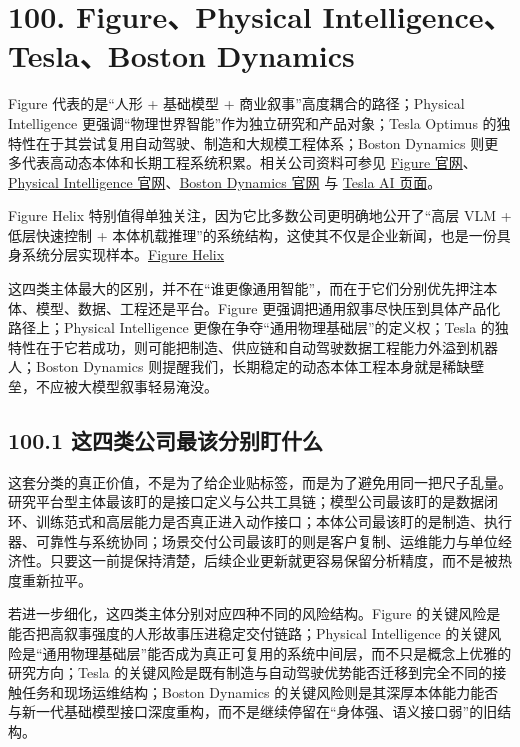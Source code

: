 \section*{100. Figure、Physical Intelligence、Tesla、Boston Dynamics}

Figure 代表的是“人形 + 基础模型 + 商业叙事”高度耦合的路径；Physical Intelligence 更强调“物理世界智能”作为独立研究和产品对象；Tesla Optimus 的独特性在于其尝试复用自动驾驶、制造和大规模工程体系；Boston Dynamics 则更多代表高动态本体和长期工程系统积累。相关公司资料可参见 \href{https://www.figure.ai/}{Figure 官网}、\href{https://www.physicalintelligence.company/}{Physical Intelligence 官网}、\href{https://bostondynamics.com/}{Boston Dynamics 官网} 与 \href{https://www.tesla.com/AI}{Tesla AI 页面}。

Figure Helix 特别值得单独关注，因为它比多数公司更明确地公开了“高层 VLM + 低层快速控制 + 本体机载推理”的系统结构，这使其不仅是企业新闻，也是一份具身系统分层实现样本。\href{https://www.figure.ai/news/helix}{Figure Helix}

这四类主体最大的区别，并不在“谁更像通用智能”，而在于它们分别优先押注本体、模型、数据、工程还是平台。Figure 更强调把通用叙事尽快压到具体产品化路径上；Physical Intelligence 更像在争夺“通用物理基础层”的定义权；Tesla 的独特性在于它若成功，则可能把制造、供应链和自动驾驶数据工程能力外溢到机器人；Boston Dynamics 则提醒我们，长期稳定的动态本体工程本身就是稀缺壁垒，不应被大模型叙事轻易淹没。

\subsection*{100.1 这四类公司最该分别盯什么}


这套分类的真正价值，不是为了给企业贴标签，而是为了避免用同一把尺子乱量。研究平台型主体最该盯的是接口定义与公共工具链；模型公司最该盯的是数据闭环、训练范式和高层能力是否真正进入动作接口；本体公司最该盯的是制造、执行器、可靠性与系统协同；场景交付公司最该盯的则是客户复制、运维能力与单位经济性。只要这一前提保持清楚，后续企业更新就更容易保留分析精度，而不是被热度重新拉平。

若进一步细化，这四类主体分别对应四种不同的风险结构。Figure 的关键风险是能否把高叙事强度的人形故事压进稳定交付链路；Physical Intelligence 的关键风险是“通用物理基础层”能否成为真正可复用的系统中间层，而不只是概念上优雅的研究方向；Tesla 的关键风险是既有制造与自动驾驶优势能否迁移到完全不同的接触任务和现场运维结构；Boston Dynamics 的关键风险则是其深厚本体能力能否与新一代基础模型接口深度重构，而不是继续停留在“身体强、语义接口弱”的旧结构。

